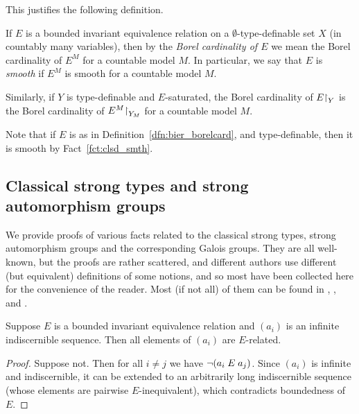 	This justifies the following definition.
	
	\begin{dfn}[$T$ countable]
		\label{dfn:bier_borelcard}
		If $E$ is a bounded invariant equivalence relation on a $\emptyset$-type-definable set $X$ (in countably many variables), then by the \emph{Borel cardinality of $E$} we mean the Borel cardinality of $E^M$ for a countable model $M$. In particular, we say that $E$ is {\em smooth} if $E^M$ is smooth for a countable model $M$.
		
		Similarly, if $Y$ is type-definable and $E$-saturated, the Borel cardinality of $E\mathord{\upharpoonright}_Y$ is the Borel cardinality of $E^M\mathord{\upharpoonright}_{Y_M}$ for a countable model $M$.\xqed{\lozenge}
	\end{dfn}
	
	\begin{rem}
		\label{rem:tdf_implies_smooth}
		Note that if $E$ is as in Definition~\ref{dfn:bier_borelcard}, and type-definable, then it is smooth by Fact~\ref{fct:clsd_smth}.\xqed{\lozenge}
	\end{rem}
	
	
	
	\subsection*{Classical strong types and strong automorphism groups}
	We provide proofs of various facts related to the classical strong types, strong automorphism groups and the corresponding Galois groups. They are all well-known, but the proofs are rather scattered, and different authors use different (but equivalent) definitions of some notions, and so most have been collected here for the convenience of the reader. Most (if not all) of them can be found in \cite{CLPZ01}, \cite{KP97}, \cite{LaPi} and \cite{Zie02}.
	
	\begin{fct}
		\label{fct:indisc_bdd}
		Suppose $E$ is a bounded invariant equivalence relation and $(a_i)$ is an infinite indiscernible sequence. Then all elements of $(a_i)$ are $E$-related.
	\end{fct}
	\begin{proof}
		Suppose not. Then for all $i\neq j$ we have $\neg (a_i \mathrel{E} a_j)$. Since $(a_i)$ is infinite and indiscernible, it can be extended to an arbitrarily long indiscernible sequence (whose elements are pairwise $E$-inequivalent), which contradicts boundedness of $E$.
	\end{proof}
	
